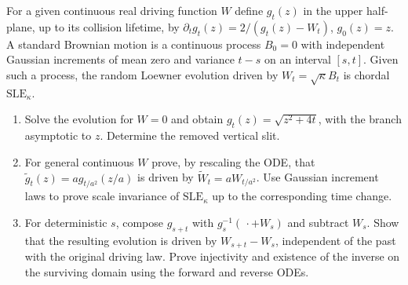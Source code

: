 \begin{exercise}
For a given continuous real driving function $W$ define
$g_t(z)$ in the upper half-plane, up to its collision lifetime,
by
$\partial_tg_t(z)=2/(g_t(z)-W_t)$, $g_0(z)=z$.
A standard Brownian motion is a continuous process $B_0=0$
with independent Gaussian increments of mean zero and
variance $t-s$ on an interval $[s,t]$.
Given such a process, the random Loewner evolution driven
by $W_t=\sqrt\kappa B_t$ is chordal $\mathrm{SLE}_\kappa$.
\begin{enumerate}[label=(\alph*)]
\item Solve the evolution for $W=0$ and obtain
$g_t(z)=\sqrt{z^2+4t}$, with the branch asymptotic to $z$.
Determine the removed vertical slit.
\item For general continuous $W$ prove, by rescaling the ODE,
that $\widetilde g_t(z)=a g_{t/a^2}(z/a)$ is driven by
$\widetilde W_t=aW_{t/a^2}$.
Use Gaussian increment laws to prove scale invariance
of $\mathrm{SLE}_\kappa$ up to the corresponding time change.
\item For deterministic $s$, compose $g_{s+t}$ with
$g_s^{-1}(\,\cdot+W_s)$ and subtract $W_s$.
Show that the resulting evolution is driven by
$W_{s+t}-W_s$, independent of the past with the original
driving law. Prove injectivity and existence of the inverse
on the surviving domain using the forward and reverse ODEs.
\end{enumerate}
\end{exercise}

